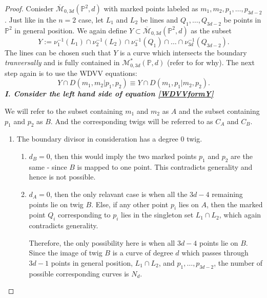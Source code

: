 \begin{proof}
    Conisder $\overline{\mathcal{M}}_{0,3d}(\mathbb{P}^{2},d)$ with marked points labeled as $m_{1}, m_{2}, p_{1}, \dots, p_{3d-2}$.
    Just like in the $n=2$ case, let $L_{1}$ and $L_{2}$ be lines and $Q_{1},\dots, Q_{3d-2}$ be points in $\mathbb{P}^{2}$ in general position.
    We again define $Y \subset \overline{\mathcal{M}}_{0,3d}(\mathbb{P}^{2},d)$ as the subset 
    \[
        Y := \nu_{1}^{-1}(L_{1}) \cap \nu_{2}^{-1}(L_{2}) \cap \nu_{3}^{-1}(Q_{1}) \cap \dots \cap \nu_{3d}^{-1}(Q_{3d-2}).
    \]
    The lines can be chosen such that $Y$ is a curve which intersects the boundary \textit{tranversally} and is fully contained in $\mathcal{M}^{*}_{0,3d}(\mathbb{P},d)$ (refer to \cite{KockQcohom} for why). 
    The next step again is to use the WDVV equations:
    \begin{equation}
        \label{WDVVformY}
        Y \cap D(m_{1}, m_{2} | p_{1}, p_{2}) \equiv Y \cap D(m_{1}, p_{1} | m_{2}, p_{2}).
    \end{equation}
    \textbf{\textit{I. Consider the left hand side of equation \ref{WDVVformY}}} 
    \par We will refer to the subset containing $m_{1}$ and $m_{2}$ as $A$ and the subset containing $p_{1}$ and $p_{2}$ as $B$.
    And the corresponding twigs will be referred to as $C_{A}$ and $C_{B}$.
    \begin{enumerate}
        \item The boundary divisor in consideration has a degree $0$ twig.
        \begin{enumerate}
            \item $d_{B} = 0$, then this would imply the two marked points $p_{1}$ and $p_{2}$ are the same - since $B$ is mapped to one point. This contradicts generality and hence is not possible.
            \item $d_{A} = 0$, then the only relavant case is when all the $3d-4$ remaining points lie on twig $B$. 
                Else, if any other point $p_{i}$ lies on $A$, then the marked point $Q_{i}$ corresponding to $p_{i}$ lies in the singleton set $L_{1}\cap L_{2}$, which again contradicts generality.
                \par Therefore, the only possibility here is when all $3d-4$ points lie on $B$.
                Since the image of twig $B$ is a curve of degree $d$ which passes through $3d-1$ points in general position, $L_{1}\cap L_{2}$, and $p_{1}, \dots, p_{3d-2}$, the number of possible corresponding curves is $N_{d}$.
        \end{enumerate}

\end{enumerate}
\end{proof}
